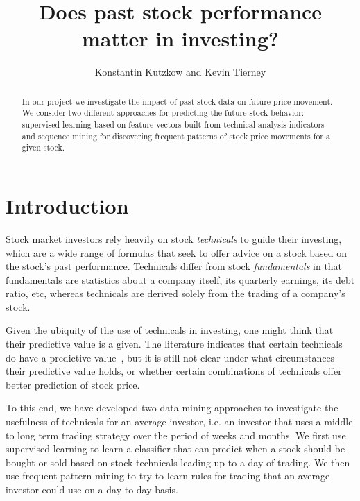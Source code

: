 \documentclass[10pt]{article}
\begin{document}
\title{Does past stock performance matter in investing?}
\date{}
\author{Konstantin Kutzkow and Kevin Tierney}
\maketitle
\begin{abstract}
In our project we investigate the impact of past stock data on future price
movement. We consider two different approaches for predicting the future stock
behavior: supervised learning based on feature vectors built
from technical analysis indicators and sequence mining for discovering
frequent patterns of stock price movements for a given stock. 
\end{abstract}
\section{Introduction}

Stock market investors rely heavily on stock \emph{technicals} to guide their
investing, which are a wide range of formulas that seek to offer advice on a
stock based on the stock's past performance. Technicals differ from stock
\emph{fundamentals} in that fundamentals are statistics about a company itself,
its quarterly earnings, its debt ratio, etc, whereas technicals are derived
solely from the trading of a company's stock.

Given the ubiquity of the use of technicals in investing, one might think that
their predictive value is a given. The literature indicates that certain
technicals do have a predictive value~\cite{brock1992}, but it is still not
clear under what circumstances their predictive value holds, or whether certain
combinations of technicals offer better prediction of stock price.

To this end, we have developed two data mining approaches to investigate the
usefulness of technicals for an average investor, i.e. an investor that uses a
middle to long term trading strategy over the period of weeks and months. We
first use supervised learning to learn a classifier that can predict when a
stock should be bought or sold based on stock technicals leading up to a day of
trading. We then use frequent pattern mining to try to learn rules for trading
that an average investor could use on a day to day basis.
% 
\end{document}
